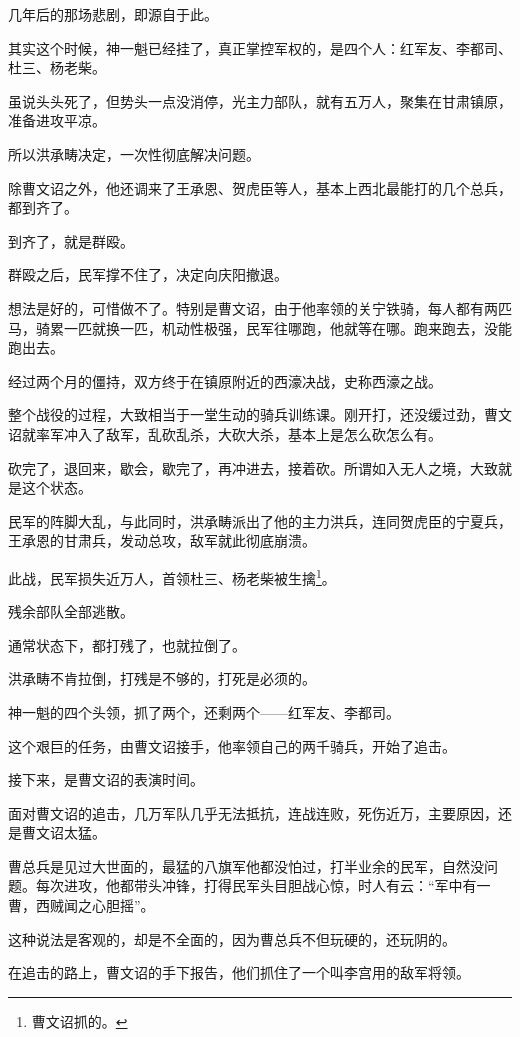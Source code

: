 \begin{multicols}{\theparacolNo}
		几年后的那场悲剧，即源自于此。

		其实这个时候，神一魁已经挂了，真正掌控军权的，是四个人：红军友、李都司、杜三、杨老柴。

		虽说头头死了，但势头一点没消停，光主力部队，就有五万人，聚集在甘肃镇原，准备进攻平凉。

		所以洪承畴决定，一次性彻底解决问题。

		除曹文诏之外，他还调来了王承恩、贺虎臣等人，基本上西北最能打的几个总兵，都到齐了。

		到齐了，就是群殴。

		群殴之后，民军撑不住了，决定向庆阳撤退。

		想法是好的，可惜做不了。特别是曹文诏，由于他率领的关宁铁骑，每人都有两匹马，骑累一匹就换一匹，机动性极强，民军往哪跑，他就等在哪。跑来跑去，没能跑出去。

		经过两个月的僵持，双方终于在镇原附近的西濠决战，史称西濠之战。

		整个战役的过程，大致相当于一堂生动的骑兵训练课。刚开打，还没缓过劲，曹文诏就率军冲入了敌军，乱砍乱杀，大砍大杀，基本上是怎么砍怎么有。

		砍完了，退回来，歇会，歇完了，再冲进去，接着砍。所谓如入无人之境，大致就是这个状态。

		民军的阵脚大乱，与此同时，洪承畴派出了他的主力洪兵，连同贺虎臣的宁夏兵，王承恩的甘肃兵，发动总攻，敌军就此彻底崩溃。

		此战，民军损失近万人，首领杜三、杨老柴被生擒\footnote{曹文诏抓的。}。

		残余部队全部逃散。

		通常状态下，都打残了，也就拉倒了。

		洪承畴不肯拉倒，打残是不够的，打死是必须的。

		神一魁的四个头领，抓了两个，还剩两个——红军友、李都司。

		这个艰巨的任务，由曹文诏接手，他率领自己的两千骑兵，开始了追击。

		接下来，是曹文诏的表演时间。

		面对曹文诏的追击，几万军队几乎无法抵抗，连战连败，死伤近万，主要原因，还是曹文诏太猛。

		曹总兵是见过大世面的，最猛的八旗军他都没怕过，打半业余的民军，自然没问题。每次进攻，他都带头冲锋，打得民军头目胆战心惊，时人有云：“军中有一曹，西贼闻之心胆摇”。

		这种说法是客观的，却是不全面的，因为曹总兵不但玩硬的，还玩阴的。

		在追击的路上，曹文诏的手下报告，他们抓住了一个叫李宫用的敌军将领。


\end{multicols}
